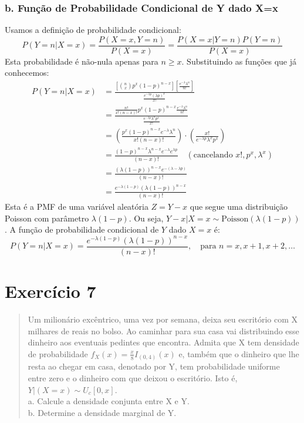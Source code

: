 \documentclass[12pt]{article}
\begin{document}
\subsubsection*{b. Função de Probabilidade Condicional de Y dado X=x}
Usamos a definição de probabilidade condicional:
\[ P(Y=n | X=x) = \frac{P(X=x, Y=n)}{P(X=x)} = \frac{P(X=x|Y=n)P(Y=n)}{P(X=x)} \]
Esta probabilidade é não-nula apenas para $n \ge x$. Substituindo as funções que já conhecemos:
\begin{align*}
P(Y=n | X=x) &= \frac{ \left[ \binom{n}{x} p^x (1-p)^{n-x} \right] \left[ \frac{e^{-\lambda}\lambda^n}{n!} \right] }{ \frac{e^{-\lambda p} (\lambda p)^x}{x!} } \\
&= \frac{ \frac{n!}{x!(n-x)!} p^x (1-p)^{n-x} \frac{e^{-\lambda}\lambda^n}{n!} }{ \frac{e^{-\lambda p} \lambda^x p^x}{x!} } \\
&= \left( \frac{p^x (1-p)^{n-x} e^{-\lambda} \lambda^n}{x!(n-x)!} \right) \cdot \left( \frac{x!}{e^{-\lambda p} \lambda^x p^x} \right) \\
&= \frac{(1-p)^{n-x} \lambda^{n-x} e^{-\lambda} e^{\lambda p}}{(n-x)!} \quad (\text{cancelando } x!, p^x, \lambda^x) \\
&= \frac{(\lambda(1-p))^{n-x} e^{-(\lambda - \lambda p)}}{(n-x)!} \\
&= \frac{e^{-\lambda(1-p)} (\lambda(1-p))^{n-x}}{(n-x)!}
\end{align*}
Esta é a PMF de uma variável aleatória $Z = Y-x$ que segue uma distribuição Poisson com parâmetro $\lambda(1-p)$. Ou seja, $Y-x | X=x \sim \text{Poisson}(\lambda(1-p))$.
A função de probabilidade condicional de $Y$ dado $X=x$ é:
\[ P(Y=n | X=x) = \frac{e^{-\lambda(1-p)} (\lambda(1-p))^{n-x}}{(n-x)!}, \quad \text{para } n = x, x+1, x+2, \dots \]
\hfill \qedsymbol

\section{Exercício 7}

\begin{quote}
Um milionário excêntrico, uma vez por semana, deixa seu escritório com X milhares de reais no bolso. Ao caminhar para sua casa vai distribuindo esse dinheiro aos eventuais pedintes que encontra. Admita que X tem densidade de probabilidade $f_X(x) = \frac{x}{8} I_{(0,4)}(x)$ e, também que o dinheiro que lhe resta ao chegar em casa, denotado por Y, tem probabilidade uniforme entre zero e o dinheiro com que deixou o escritório. Isto é, $Y|(X=x) \sim U_c[0,x]$. \\
a. Calcule a densidade conjunta entre X e Y. \\
b. Determine a densidade marginal de Y.
\end{quote}
\end{document}
